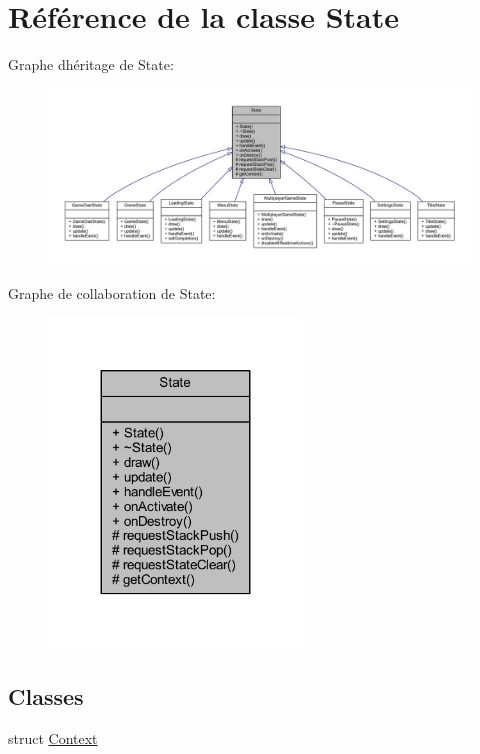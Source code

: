 \hypertarget{class_state}{}\section{Référence de la classe State}
\label{class_state}


Graphe d\textquotesingle{}héritage de State\+:\nopagebreak
\begin{figure}[H]
\begin{center}
\leavevmode
\includegraphics[width=350pt]{class_state__inherit__graph}
\end{center}
\end{figure}


Graphe de collaboration de State\+:\nopagebreak
\begin{figure}[H]
\begin{center}
\leavevmode
\includegraphics[width=191pt]{class_state__coll__graph}
\end{center}
\end{figure}
\subsection*{Classes}
\begin{DoxyCompactItemize}
\item 
struct \hyperlink{struct_state_1_1_context}{Context}
\end{DoxyCompactItemize}
